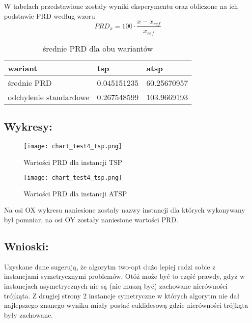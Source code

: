 W tabelach przedstawione zostały wyniki eksperymentu oraz obliczone na ich podstawie PRD według wzoru \[ PRD_x = 100 \cdot \frac{x - x_{ref}}{x_{ref}}\]

\begin{table}[H]
  \centering
  \begin{tabular}{|l|l|l|}
  \hline
     wariant & tsp & atsp \\ \hline \hline
     średnie PRD & 0.045151235 & 60.25670957 \\ \hline
     odchylenie standardowe & 0.267548599 & 103.9669193 \\ \hline
  \end{tabular}
  \caption{średnie PRD dla obu wariantów}
\end{table}

\subsection{Wykresy: }
\begin{figure}[H]
    \centering
    \texttt{[image: chart\_test4\_tsp.png]}
    \caption{Wartości PRD dla instancji TSP}
\end{figure}
\begin{figure}[H]
  \centering
  \texttt{[image: chart\_test4\_tsp.png]}
  \caption{Wartości PRD dla instancji ATSP}
\end{figure}
Na osi OX wykresu naniesione zostały nazwy instancji dla których wykonywany był pomniar, na osi OY zostały naniesione wartości PRD.

\subsection{Wnioski: }
Uzyskane dane sugerują, że algorytm two-opt dużo lepiej radzi sobie z instancjami symetrycznymi problemów. Otóż może być to część prawdy, gdyż w instancjach asymetrycznych nie są (nie muszą być) zachowane nierówności trójkąta. Z drugiej strony 2 instancje symetryczne w których algorytm nie dał najlepszego znanego wyniku miały postać euklidesową gdzie nierówności trójkąta były zachowane. 


